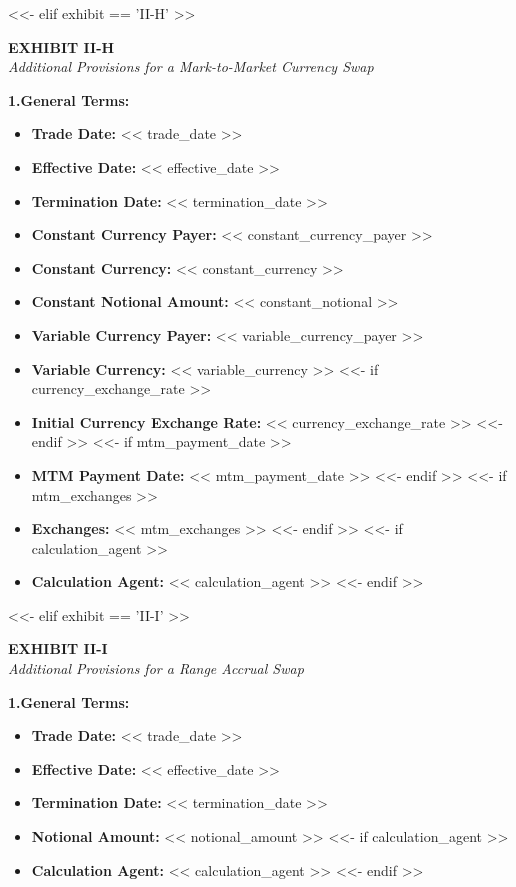 \documentclass[11pt, a4paper]{article}
\begin{document}
<<- elif exhibit == 'II-H' >>
\begin{center}
    \textbf{EXHIBIT II-H} \\
    \textit{Additional Provisions for a Mark-to-Market Currency Swap}
\end{center}

\vspace{0.3cm}
\noindent \textbf{1.\quad General Terms:}
\begin{itemize}[leftmargin=2cm, label={}, itemsep=3pt]
    \item \textbf{Trade Date:} << trade_date >>
    \item \textbf{Effective Date:} << effective_date >>
    \item \textbf{Termination Date:} << termination_date >>
    \item \textbf{Constant Currency Payer:} << constant_currency_payer >>
    \item \textbf{Constant Currency:} << constant_currency >>
    \item \textbf{Constant Notional Amount:} << constant_notional >>
    \item \textbf{Variable Currency Payer:} << variable_currency_payer >>
    \item \textbf{Variable Currency:} << variable_currency >>
<<- if currency_exchange_rate >>
    \item \textbf{Initial Currency Exchange Rate:} << currency_exchange_rate >>
<<- endif >>
<<- if mtm_payment_date >>
    \item \textbf{MTM Payment Date:} << mtm_payment_date >>
<<- endif >>
<<- if mtm_exchanges >>
    \item \textbf{Exchanges:} << mtm_exchanges >>
<<- endif >>
<<- if calculation_agent >>
    \item \textbf{Calculation Agent:} << calculation_agent >>
<<- endif >>
\end{itemize}

<<- elif exhibit == 'II-I' >>
\begin{center}
    \textbf{EXHIBIT II-I} \\
    \textit{Additional Provisions for a Range Accrual Swap}
\end{center}

\vspace{0.3cm}
\noindent \textbf{1.\quad General Terms:}
\begin{itemize}[leftmargin=2cm, label={}, itemsep=3pt]
    \item \textbf{Trade Date:} << trade_date >>
    \item \textbf{Effective Date:} << effective_date >>
    \item \textbf{Termination Date:} << termination_date >>
    \item \textbf{Notional Amount:} << notional_amount >>
<<- if calculation_agent >>
    \item \textbf{Calculation Agent:} << calculation_agent >>
<<- endif >>
\end{itemize}
\end{document}
